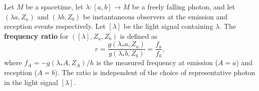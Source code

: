 Let $M$ be a spacetime, let $\lambda: [a, b] \to M$ be a freely falling photon, and let $(\lambda a, Z_a)$ and $(\lambda b, Z_b)$ be instantaneous observers at the emission and reception events respectively. Let $[\lambda]$ be the light signal containing $\lambda$. The \textbf{frequency ratio} for $([\lambda], Z_a, Z_b)$ is defined as
$$
r = \frac{g(\lambda_* a, Z_a)}{g(\lambda_* b, Z_b)} = \frac{f_a}{f_b},
$$
where $f_A = -g(\lambda_* A, Z_A)/h$ is the measured frequency at emission ($A = a$) and reception ($A = b$). The ratio is independent of the choice of representative photon in the light signal $[\lambda]$.
